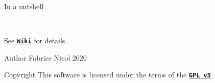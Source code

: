 In a nutshell ~\newline

\begin{DoxyCode}{0}

\end{DoxyCode}
 ~\newline


See \href{https://github.com/fabnicol/gentoo-creator/wiki}{\texttt{ {\bfseries{Wiki}}}} for details. ~\newline
\begin{DoxyAuthor}{Author}
Fabrice Nicol 2020 
\end{DoxyAuthor}
\begin{DoxyCopyright}{Copyright}
This software is licensed under the terms of the \href{https://www.gnu.org/licenses/gpl-3.0.en.html}{\texttt{ {\bfseries{GPL v3}}}} 
\end{DoxyCopyright}
